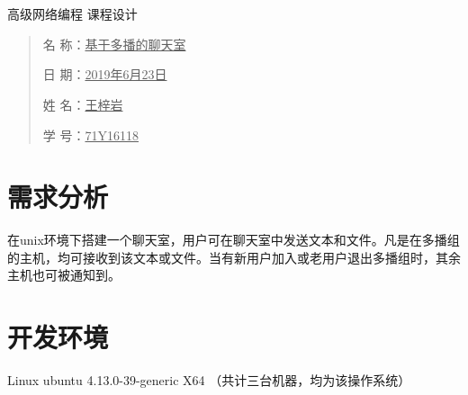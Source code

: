 \documentclass[UTF8]{ctexart}
\begin{document}
\nocite{*}%

	\begin{center}
		\quad \\
		\quad \\
		\vskip 3.5cm
		\heiti \fontsize{45}{17} 高级网络编程
		\vskip 3.5cm
		\heiti \fontsize{39}{17} 课程设计
	\end{center}
	\vskip 3.5cm
	\begin{quotation}
		\heiti \fontsize{36}{17}
		\doublespacing
		\par\setlength\parindent{12em}
		\quad 
		\heiti		
		
		名\hspace{0.61cm} 称：\underline{基于多播的聊天室}
		
		日\hspace{0.61cm} 期：\underline{2019年6月23日}
		
		姓\hspace{0.61cm} 名：\underline{王梓岩}
		
		学\hspace{0.61cm} 号：\underline{71Y16118}
		
		\vskip 2cm
		\centering
	\end{quotation}
	
\newpage
\songti \fontsize{13}{13}
\large
\section{需求分析}
在unix环境下搭建一个聊天室，用户可在聊天室中发送文本和文件。凡是在多播组的主机，均可接收到该文本或文件。当有新用户加入或老用户退出多播组时，其余主机也可被通知到。
\section{开发环境}
Linux ubuntu 4.13.0-39-generic X64 （共计三台机器，均为该操作系统）
\end{document}
